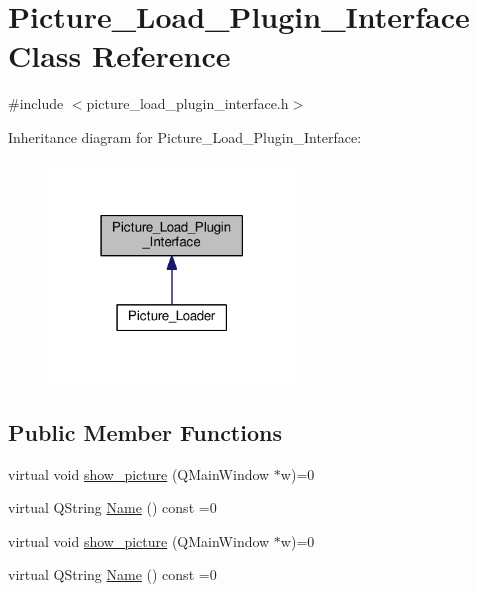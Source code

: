 \hypertarget{classPicture__Load__Plugin__Interface}{}\section{Picture\+\_\+\+Load\+\_\+\+Plugin\+\_\+\+Interface Class Reference}
\label{classPicture__Load__Plugin__Interface}


{\ttfamily \#include $<$picture\+\_\+load\+\_\+plugin\+\_\+interface.\+h$>$}



Inheritance diagram for Picture\+\_\+\+Load\+\_\+\+Plugin\+\_\+\+Interface\+:\nopagebreak
\begin{figure}[H]
\begin{center}
\leavevmode
\includegraphics[width=186pt]{classPicture__Load__Plugin__Interface__inherit__graph}
\end{center}
\end{figure}
\subsection*{Public Member Functions}
\begin{DoxyCompactItemize}
\item 
virtual void \hyperlink{classPicture__Load__Plugin__Interface_a2d90e62b277854046ebcdac8ffadf0d5}{show\+\_\+picture} (Q\+Main\+Window $\ast$w)=0
\item 
virtual Q\+String \hyperlink{classPicture__Load__Plugin__Interface_a7cb4c7354f06bc7408ce1072e46db030}{Name} () const =0
\item 
virtual void \hyperlink{classPicture__Load__Plugin__Interface_a2d90e62b277854046ebcdac8ffadf0d5}{show\+\_\+picture} (Q\+Main\+Window $\ast$w)=0
\item 
virtual Q\+String \hyperlink{classPicture__Load__Plugin__Interface_a7cb4c7354f06bc7408ce1072e46db030}{Name} () const =0
\end{DoxyCompactItemize}


